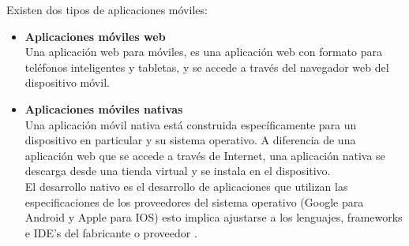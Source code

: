 Existen dos tipos de aplicaciones móviles: \\
 \begin{itemize}
 	\item \textbf{Aplicaciones móviles web} \\
 	
 	Una aplicación web para móviles, es una aplicación web con formato para teléfonos inteligentes y tabletas, y se accede a través del navegador web del dispositivo móvil. \\
 	
 	\item \textbf{Aplicaciones móviles nativas} \\
 	
 	Una aplicación móvil nativa está construida específicamente para un dispositivo en particular y su sistema operativo. A diferencia de una aplicación web que se accede a través de Internet, una aplicación nativa se descarga desde una tienda virtual y se instala en el dispositivo. \\
 	
 	El desarrollo nativo es el desarrollo de aplicaciones que utilizan las especificaciones de los proveedores del sistema operativo (Google para Android y Apple para IOS) esto implica ajustarse a los lenguajes, frameworks e IDE’s del fabricante o proveedor \cite{treintaytres}.
 	
 \end{itemize}
